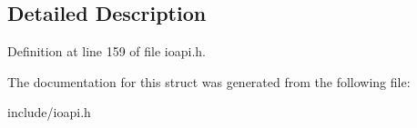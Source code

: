 \subsection{Detailed Description}


Definition at line 159 of file ioapi.\-h.



The documentation for this struct was generated from the following file\-:\begin{DoxyCompactItemize}
\item 
include/ioapi.\-h\end{DoxyCompactItemize}
